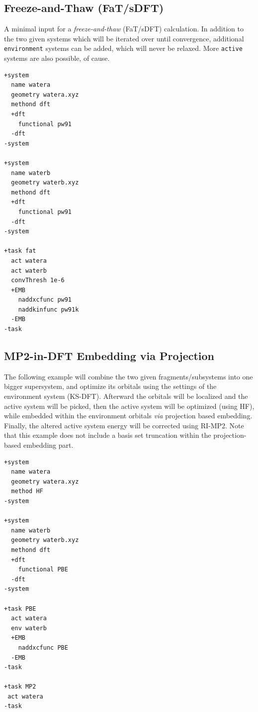 \documentclass[bibliography=totocnumbered,a4paper,10pt]{scrartcl}
\begin{document}
\subsection{Freeze-and-Thaw (FaT/sDFT)}
A minimal input for a \textit{freeze-and-thaw} (FaT/sDFT) calculation.
In addition to the two given systems which will be iterated over until
convergence, additional \texttt{environment} systems can be added, which will never 
be relaxed. More \texttt{active} systems are also possible, of cause.
\begin{lstlisting}
+system
  name watera
  geometry watera.xyz
  methond dft
  +dft
    functional pw91
  -dft
-system

+system
  name waterb
  geometry waterb.xyz
  methond dft
  +dft
    functional pw91
  -dft
-system

+task fat
  act watera
  act waterb
  convThresh 1e-6
  +EMB
    naddxcfunc pw91
    naddkinfunc pw91k
  -EMB
-task
\end{lstlisting}

\clearpage
\subsection{MP2-in-DFT Embedding via Projection}
The following example will combine the two given fragments/subsystems into one bigger supersystem, and optimize its orbitals using
the settings of the environment system (KS-DFT). Afterward the orbitals will be localized and the active system will be picked, 
then the active system will be optimized (using HF), while embedded within the environment orbitals \textit{via} projection based embedding.
Finally, the altered active system energy will be corrected using RI-MP2. Note that this example does not include a basis set truncation within
the projection-based embedding part.
\begin{lstlisting}
+system
  name watera
  geometry watera.xyz
  method HF
-system

+system
  name waterb
  geometry waterb.xyz
  methond dft
  +dft
    functional PBE
  -dft
-system

+task PBE
  act watera
  env waterb
  +EMB
    naddxcfunc PBE
  -EMB
-task

+task MP2
 act watera
-task

\end{lstlisting}
\clearpage
\end{document}
